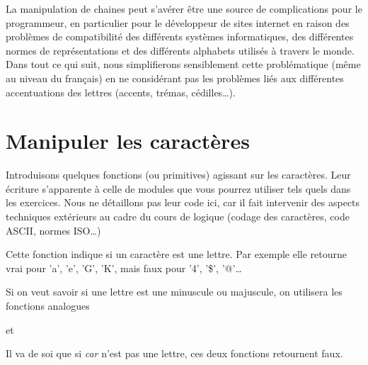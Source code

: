 	La manipulation de chaines peut s'avérer être 
	une source de complications pour le programmeur, 
	en particulier pour le développeur de sites internet 
	en raison des problèmes de compatibilité des différents systèmes informatiques, 
	des différentes normes de représentations 
	et des différents alphabets utilisés à travers le monde. 
	Dans tout ce qui suit, 
	nous simplifierons sensiblement cette problématique 
	(même au niveau du français) 
	en ne considérant pas les problèmes liés aux différentes 
	accentuations des lettres (accents, trémas, cédilles\dots). 

\section{Manipuler les caractères}

	Introduisons quelques fonctions (ou primitives) 
	agissant sur les caractères. 
	Leur écriture s'apparente à celle de modules 
	que vous pourrez utiliser tels quels dans les exercices. 
	Nous ne détaillons pas leur code ici, 
	car il fait intervenir des aspects techniques 
	extérieurs au cadre du cours de logique 
	(codage des caractères, code ASCII, normes ISO\dots)

	\begin{center}
	\end{center}

	Cette fonction indique si un caractère est une lettre. 
	Par exemple elle retourne vrai pour 'a', 'e', 'G', 'K', 
	mais faux pour '4', '\$', '@'\dots %
		
	Si on veut savoir si une lettre est une minuscule ou majuscule, 
	on utilisera les fonctions analogues

	\begin{center}
	\end{center}
	
	et

	\begin{center}
	\end{center}

	Il va de soi que si \textit{car} n'est pas une lettre, 
	ces deux fonctions retournent faux.

	\begin{center}
	\end{center}

